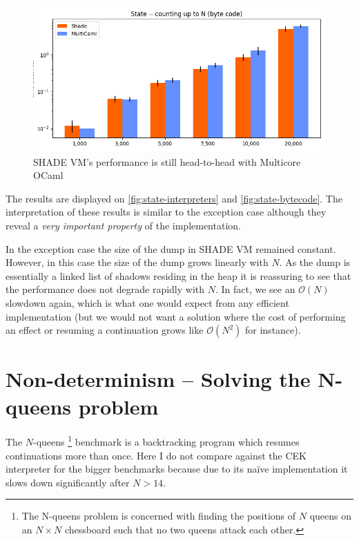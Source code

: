 \documentclass[class=article, crop=false]{standalone}
\begin{document}
\begin{figure}
    \centering
    \includegraphics[width=35em]{eval_plots/comp_state.png}
    \caption{SHADE VM's performance is still head-to-head with Multicore OCaml}
    \label{fig:state-bytecode}
\end{figure}

The results are displayed on \autoref{fig:state-interpreters} and
\autoref{fig:state-bytecode}. The interpretation of these results is similar to
the exception case although they reveal a \emph{very important property} of the implementation.

In the exception case the size of the dump in SHADE VM remained constant.
However, in this case the size of the dump grows
linearly with $N$. As the dump is essentially a linked list of shadows residing
in the heap it is reassuring to see that the performance does not degrade
rapidly with $N$. In fact, we see an $\mathcal{O}(N)$ slowdown again, which is
what one would expect from any efficient implementation (but we would not want a
solution where the cost of performing an effect or resuming a continuation grows
like $\mathcal{O}(N^2)$ for instance).

\section{Non-determinism -- Solving the N-queens problem}

The $N$-queens
\footnote{The N-queens problem is concerned with finding the positions of $N$
queens on an $N \times N$ chessboard such that no two queens attack each other.}
benchmark is a backtracking program which resumes continuations more than once.
Here I do not compare against the CEK interpreter for the bigger benchmarks
because due to its naïve implementation it slows down significantly after
$N > 14$. 
\end{document}
